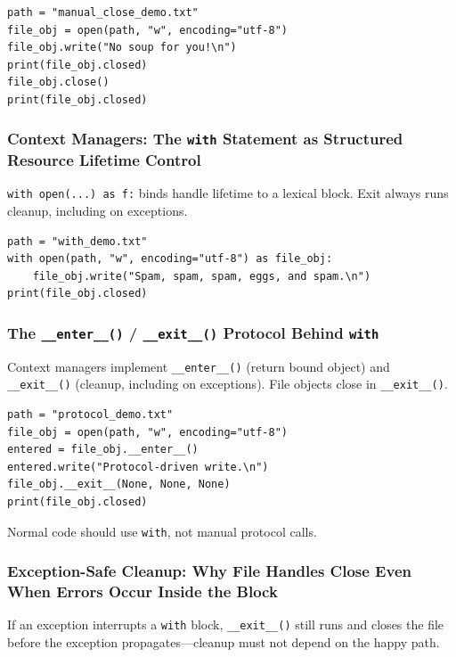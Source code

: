 \documentclass[a4paper,twoside]{report}
\begin{document}
\begin{verbatim}
path = "manual_close_demo.txt"
file_obj = open(path, "w", encoding="utf-8")
file_obj.write("No soup for you!\n")
print(file_obj.closed)
file_obj.close()
print(file_obj.closed)
\end{verbatim}

\subsubsection{Context Managers: The \texttt{with} Statement as Structured Resource Lifetime Control}

\texttt{with open(...) as f:} binds handle lifetime to a lexical block. Exit always runs cleanup, including on exceptions.

\begin{verbatim}
path = "with_demo.txt"
with open(path, "w", encoding="utf-8") as file_obj:
    file_obj.write("Spam, spam, spam, eggs, and spam.\n")
print(file_obj.closed)
\end{verbatim}

\subsubsection{The \texttt{\_\_enter\_\_()} / \texttt{\_\_exit\_\_()} Protocol Behind \texttt{with}}

Context managers implement \texttt{\_\_enter\_\_()} (return bound object) and \texttt{\_\_exit\_\_()} (cleanup, including on exceptions). File objects close in \texttt{\_\_exit\_\_()}.

\begin{verbatim}
path = "protocol_demo.txt"
file_obj = open(path, "w", encoding="utf-8")
entered = file_obj.__enter__()
entered.write("Protocol-driven write.\n")
file_obj.__exit__(None, None, None)
print(file_obj.closed)
\end{verbatim}

Normal code should use \texttt{with}, not manual protocol calls.

\subsubsection{Exception-Safe Cleanup: Why File Handles Close Even When Errors Occur Inside the Block}

If an exception interrupts a \texttt{with} block, \texttt{\_\_exit\_\_()} still runs and closes the file before the exception propagates---cleanup must not depend on the happy path.
\end{document}
